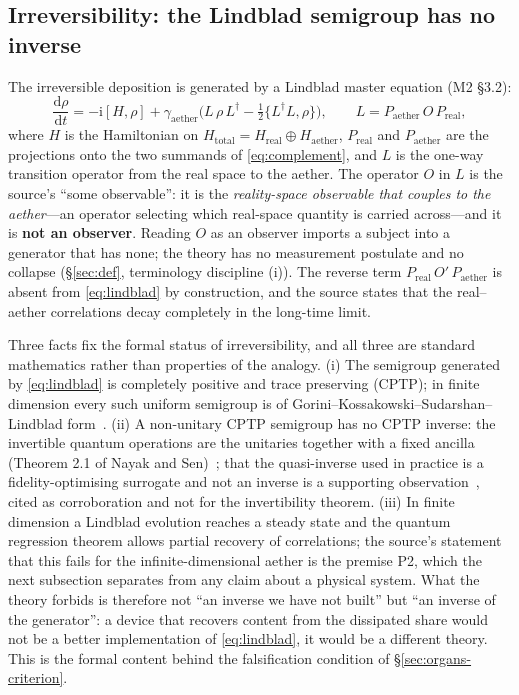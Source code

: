 \documentclass[11pt,a4paper]{article}
\newcommand{\Haether}{H_{\mathrm{aether}}}
\newcommand{\Hreal}{H_{\mathrm{real}}}
\newcommand{\Htotal}{H_{\mathrm{total}}}
\begin{document}
\subsection{Irreversibility: the Lindblad semigroup has no inverse}
\label{sec:framework-lindblad}

The irreversible deposition is generated by a Lindblad master equation (M2 §3.2):
\begin{equation}
\frac{\mathrm{d}\rho}{\mathrm{d}t} = -\mathrm{i}[H,\rho] + \gamma_{\mathrm{aether}}\Big( L\,\rho\,L^{\dagger} - \tfrac12\{L^{\dagger}L,\rho\} \Big), \qquad L = P_{\mathrm{aether}}\,O\,P_{\mathrm{real}},
\label{eq:lindblad}
\end{equation}
where $H$ is the Hamiltonian on $\Htotal = \Hreal \oplus \Haether$, $P_{\mathrm{real}}$ and $P_{\mathrm{aether}}$ are the projections onto the two summands of \eqref{eq:complement}, and $L$ is the one-way transition operator from the real space to the aether. The operator $O$ in $L$ is the source's ``some observable'': it is the \emph{reality-space observable that couples to the aether}---an operator selecting which real-space quantity is carried across---and it is \textbf{not an observer}. Reading $O$ as an observer imports a subject into a generator that has none; the theory has no measurement postulate and no collapse (\S\ref{sec:def}, terminology discipline (i)). The reverse term $P_{\mathrm{real}}\,O'\,P_{\mathrm{aether}}$ is absent from \eqref{eq:lindblad} by construction, and the source states that the real--aether correlations decay completely in the long-time limit.

Three facts fix the formal status of irreversibility, and all three are standard mathematics rather than properties of the analogy. (i) The semigroup generated by \eqref{eq:lindblad} is completely positive and trace preserving (CPTP); in finite dimension every such uniform semigroup is of Gorini--Kossakowski--Sudarshan--Lindblad form~\cite{lindblad1976,gorini1976,davies1970}. (ii) A non-unitary CPTP semigroup has no CPTP inverse: the invertible quantum operations are the unitaries together with a fixed ancilla (Theorem 2.1 of Nayak and Sen)~\cite{nayak2007}; that the quasi-inverse used in practice is a fidelity-optimising surrogate and not an inverse is a supporting observation~\cite{karimipour2020}, cited as corroboration and not for the invertibility theorem. (iii) In finite dimension a Lindblad evolution reaches a steady state and the quantum regression theorem allows partial recovery of correlations; the source's statement that this fails for the infinite-dimensional aether is the premise P2, which the next subsection separates from any claim about a physical system. What the theory forbids is therefore not ``an inverse we have not built'' but ``an inverse of the generator'': a device that recovers content from the dissipated share would not be a better implementation of \eqref{eq:lindblad}, it would be a different theory. This is the formal content behind the falsification condition of \S\ref{sec:organs-criterion}.
\end{document}
